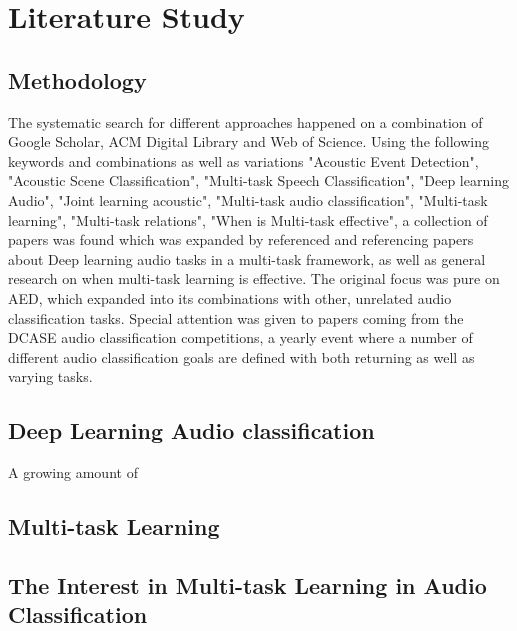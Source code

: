 \chapter{Literature Study}


\section{Methodology}

The systematic search for different approaches happened on a combination of Google Scholar, ACM Digital Library and Web of Science. Using the following keywords and combinations as well as variations "Acoustic Event Detection", "Acoustic Scene Classification", "Multi-task Speech Classification", "Deep learning Audio", "Joint learning acoustic", "Multi-task audio classification", "Multi-task learning", "Multi-task relations", "When is Multi-task effective", a collection of papers was found which was expanded by referenced and referencing papers about Deep learning audio tasks in a multi-task framework, as well as general research on when multi-task learning is effective. The original focus was pure on AED, which expanded into its combinations with other, unrelated audio classification tasks. Special attention was given to papers coming from the DCASE audio classification competitions, a yearly event where a number of different audio classification goals are defined with both returning as well as varying tasks. 

\section{Deep Learning Audio classification}


A growing amount of 

\section{Multi-task Learning}

\section{The Interest in Multi-task Learning in Audio Classification}